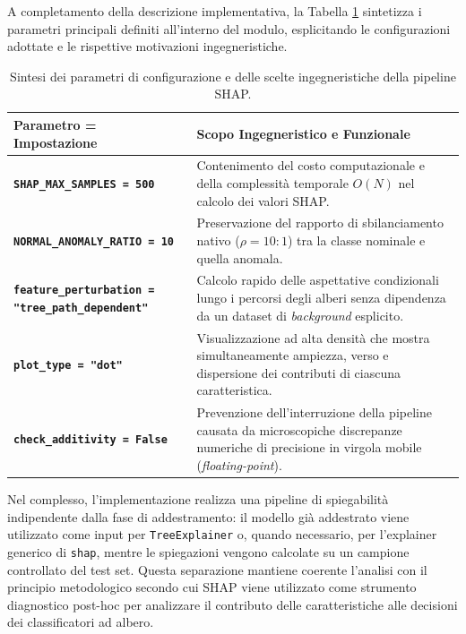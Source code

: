 A completamento della descrizione implementativa, la Tabella \ref{tab:shap_config_parameters} sintetizza i parametri principali definiti all'interno del modulo, esplicitando le configurazioni adottate e le rispettive motivazioni ingegneristiche.

\begin{table}[H]
    \centering
    \small
    \caption{Sintesi dei parametri di configurazione e delle scelte ingegneristiche della pipeline SHAP.}
    \label{tab:shap_config_parameters}
    \begin{tabularx}{\textwidth}{>{\raggedright\arraybackslash}p{6cm} >{\raggedright\arraybackslash}X}
        \toprule
        \textbf{Parametro = Impostazione} & \textbf{Scopo Ingegneristico e Funzionale} \\
        \midrule
        \textbf{\texttt{SHAP\_MAX\_SAMPLES = 500}} & 
        Contenimento del costo computazionale e della complessità temporale $O(N)$ nel calcolo dei valori SHAP. \\
        \textbf{\texttt{NORMAL\_ANOMALY\_RATIO = 10}} & 
        Preservazione del rapporto di sbilanciamento nativo ($\rho = 10:1$) tra la classe nominale e quella anomala. \\
        \textbf{\texttt{feature\_perturbation = "tree\_path\_dependent"}} & 
        Calcolo rapido delle aspettative condizionali lungo i percorsi degli alberi senza dipendenza da un dataset di \textit{background} esplicito. \\
        \textbf{\texttt{plot\_type = "dot"}} & 
        Visualizzazione ad alta densità che mostra simultaneamente ampiezza, verso e dispersione dei contributi di ciascuna caratteristica. \\
        \textbf{\texttt{check\_additivity = False}} & 
        Prevenzione dell'interruzione della pipeline causata da microscopiche discrepanze numeriche di precisione in virgola mobile (\textit{floating-point}). \\
        \bottomrule
    \end{tabularx}
\end{table}

Nel complesso, l'implementazione realizza una pipeline di spiegabilità indipendente dalla fase di addestramento: il modello già addestrato viene utilizzato come input per \texttt{TreeExplainer} o, quando necessario, per l'explainer generico di \texttt{shap}, mentre le spiegazioni vengono calcolate su un campione controllato del test set. 
Questa separazione mantiene coerente l'analisi con il principio metodologico secondo cui SHAP viene utilizzato come strumento diagnostico post-hoc per analizzare il contributo delle caratteristiche alle decisioni dei classificatori ad albero.

